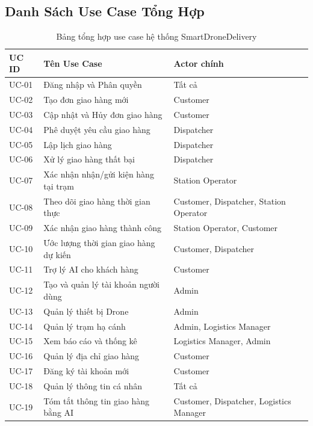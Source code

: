 \subsection{Danh Sách Use Case Tổng Hợp}

\begin{table}[H]
  \centering
  \begin{tabularx}{\textwidth}{|l|X|l|}
    \hline
    \textbf{UC ID} & \textbf{Tên Use Case} & \textbf{Actor chính} \\
    \hline
    UC-01 & Đăng nhập và Phân quyền                  & Tất cả \\ \hline
    UC-02 & Tạo đơn giao hàng mới                    & Customer \\ \hline
    UC-03 & Cập nhật và Hủy đơn giao hàng             & Customer \\ \hline
    UC-04 & Phê duyệt yêu cầu giao hàng              & Dispatcher \\ \hline
    UC-05 & Lập lịch giao hàng                       & Dispatcher \\ \hline
    UC-06 & Xử lý giao hàng thất bại                 & Dispatcher \\ \hline
    UC-07 & Xác nhận nhận/gửi kiện hàng tại trạm     & Station Operator \\ \hline
    UC-08 & Theo dõi giao hàng thời gian thực        & Customer, Dispatcher, Station Operator \\ \hline
    UC-09 & Xác nhận giao hàng thành công            & Station Operator, Customer \\ \hline
    UC-10 & Ước lượng thời gian giao hàng dự kiến    & Customer, Dispatcher \\ \hline
    UC-11 & Trợ lý AI cho khách hàng                 & Customer \\ \hline
    UC-12 & Tạo và quản lý tài khoản người dùng      & Admin \\ \hline
    UC-13 & Quản lý thiết bị Drone                   & Admin \\ \hline
    UC-14 & Quản lý trạm hạ cánh                     & Admin, Logistics Manager \\ \hline
    UC-15 & Xem báo cáo và thống kê      & Logistics Manager, Admin \\ \hline
    UC-16 & Quản lý địa chỉ giao hàng                & Customer \\ \hline
    UC-17 & Đăng ký tài khoản mới                    & Customer \\ \hline
    UC-18 & Quản lý thông tin cá nhân                & Tất cả \\ \hline
    UC-19 & Tóm tắt thông tin giao hàng bằng AI      & Customer, Dispatcher, Logistics Manager \\
    \hline
  \end{tabularx}
  \caption{Bảng tổng hợp use case hệ thống SmartDroneDelivery}
  \label{tab:usecases}
\end{table}

